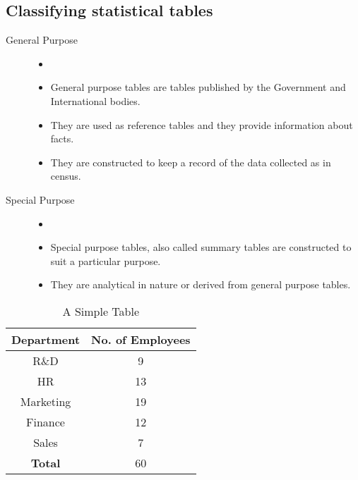 \documentclass[
10pt, %
a4paper, %
]{report}
\begin{document}
\subsection*{Classifying statistical tables}
\begin{description}
\item[General Purpose]
\begin{itemize}
\item[]
\item General purpose tables are tables published by the Government and International bodies.
\item They are used as reference tables and they provide information about facts.
\item They are constructed to keep a record of the data collected as in census.
\end{itemize}
\item[Special Purpose]
\begin{itemize}
\item[]
\item Special purpose tables, also called summary tables are constructed to suit a particular purpose.
\item They are analytical in nature or derived from general purpose tables.
\end{itemize}
\end{description}

\begin{table} %
\begin{center}
\begin{tabular}{| c | c |}
\hline
Department & No. of Employees \\
\hline \hline
R\&D & 9 \\
\hline
HR & 13 \\
\hline
Marketing & 19 \\
\hline
Finance & 12 \\
\hline
Sales & 7 \\
\hline
\hline
\textbf{Total} & 60 \\
\hline
\end{tabular}
\end{center}
\caption{A Simple Table}
\label{tab:simple}
\end{table}
\end{document}
